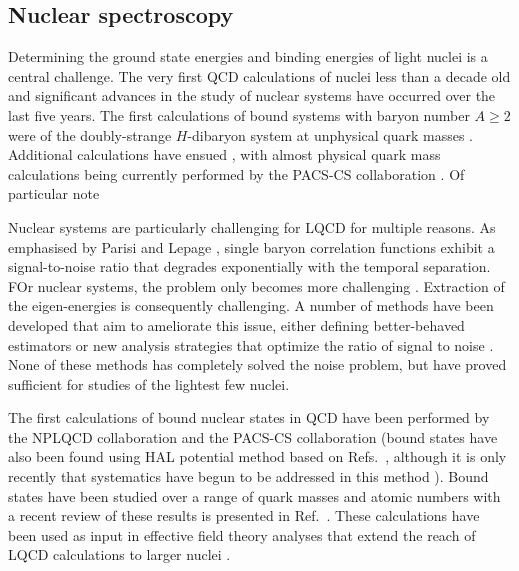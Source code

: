 
 

\subsection{Nuclear spectroscopy}

Determining the ground state energies and binding energies of light nuclei is a central challenge. The very first QCD calculations of nuclei less than a decade old and significant advances in the study of nuclear systems have occurred over the last five years.
The first calculations of bound systems with baryon number $A\ge2$ were of the doubly-strange $H$-dibaryon system at unphysical quark masses
\cite{Beane:2010hg,Inoue:2010es,Beane:2011xf}. Additional calculations have ensued \cite{Beane:2012vq,Yamazaki:2012hi,Yamazaki:2015asa}, with almost physical quark mass calculations being currently performed by the PACS-CS collaboration \cite{}. Of particular note

Nuclear systems are particularly challenging for LQCD for multiple reasons. As emphasised by Parisi and Lepage \cite{Lepage:1989hd,Parisi:1983ae,Hamber:1983vu}, single baryon correlation functions exhibit a signal-to-noise ratio that degrades exponentially with the temporal separation. FOr nuclear systems, the problem only becomes more challenging \cite{Beane:2009kya,Beane:2009gs}. Extraction of the eigen-energies is consequently challenging. A number of methods have been developed that aim to ameliorate this issue, either defining better-behaved estimators \cite{Beane:2014oea,Wagman:2017gqi,Wagman:2017xfh,Wagman:2016bam} or new analysis strategies that optimize the ratio of signal to noise \cite{Detmold:2014hla}. None of these methods has completely solved the noise problem, but have proved sufficient for studies of the lightest few nuclei. 

The first calculations of bound nuclear states in QCD have been performed by the NPLQCD collaboration \cite{} and the PACS-CS collaboration (bound states have also been found using HAL potential method \cite{} based on Refs.~\cite{}, although it is only recently that systematics have begun to be addressed in this method \cite{}). Bound states have been studied over a range of quark masses and atomic numbers with a recent review of these results is presented in Ref.~\cite{}. These calculations have been used as input in effective field theory analyses that extend the reach of LQCD calculations to larger nuclei \cite{Barnea:2013uqa,MORE}.


